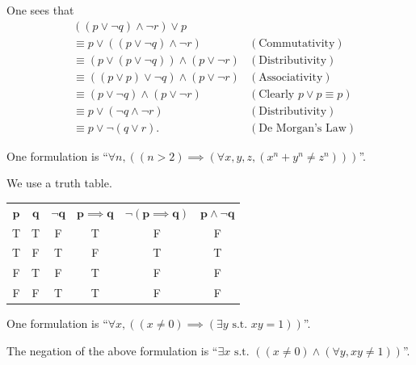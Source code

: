 \begin{questions}
    \item One sees that
    \begin{align*}
        &((p \lor \lnot q) \land \lnot r) \lor p\\
        &\equiv p \lor ((p \lor \lnot q) \land \lnot r) & (\text{Commutativity})\\
        &\equiv (p \lor (p \lor \lnot q)) \land (p \lor \lnot r) & (\text{Distributivity})\\
        &\equiv ((p \lor p) \lor \lnot q) \land (p \lor \lnot r) & (\text{Associativity})\\
        &\equiv (p \lor \lnot q) \land (p \lor \lnot r) & (\text{Clearly } p \lor p \equiv p)\\
        &\equiv p \lor (\lnot q \land \lnot r) & (\text{Distributivity})\\
        &\equiv p \lor \lnot(q \lor r). & (\text{De Morgan's Law})
    \end{align*}

    \item One formulation is ``$\forall n, ((n > 2) \implies (\forall x, y, z, (x^n + y^n \neq z^n)))$''.
    
    \item We use a truth table.
    \begin{table}[H]
        \centering
        \begin{tabular}{|c|c||c|c||c|c|}
            \hline
            $\boldsymbol{p}$ & $\boldsymbol{q}$ & $\boldsymbol{\lnot q}$ & $\boldsymbol{p \implies q}$ & $\boldsymbol{\lnot(p \implies q)}$ & $\boldsymbol{p \land \lnot q}$ \\ \hhline{|=|=#=|=#=|=|}
            T & T & F & T & F & F \\ \hline
            T & F & T & F & T & T \\ \hline
            F & T & F & T & F & F \\ \hline
            F & F & T & T & F & F \\ \hline
        \end{tabular}
    \end{table}

    \item \begin{partquestions}{\roman*}
        \item One formulation is ``$\forall x, ((x \neq 0) \implies (\exists y \text{ s.t. } xy = 1))$''.
        \item The negation of the above formulation is ``$\exists x \text{ s.t. } ((x \neq 0) \land (\forall y, xy \neq 1))$''.
    \end{partquestions}
\end{questions}
